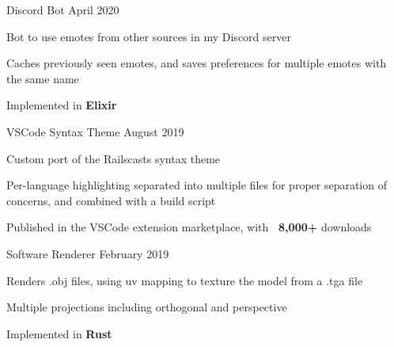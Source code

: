 

\begin{cventries}
    \cventry
    {Discord Bot} %
    {} %
    {}{April 2020}{
        \begin{cvitems} %
            \item {Bot to use emotes from other sources in my Discord server}
            \item {Caches previously seen emotes, and saves preferences for multiple emotes with the same name}
            \item {Implemented in \textbf{Elixir}}
        \end{cvitems}
    }

    \cventry
    {VSCode Syntax Theme} %
    {} %
    {}{August 2019}{
        \begin{cvitems} %
            \item {Custom port of the Railscasts syntax theme}
            \item {Per-language highlighting separated into multiple files for proper separation of concerns, and combined with a build script}
            \item {Published in the VSCode extension marketplace, with \textbf{~8,000+} downloads}
        \end{cvitems}
    }

    \cventry
    {Software Renderer} %
    {} %
    {}{February 2019}{
        \begin{cvitems} %
            \item {Renders .obj files, using uv mapping to texture the model from a .tga file}
            \item {Multiple projections including orthogonal and perspective}
            \item {Implemented in \textbf{Rust}}
        \end{cvitems}
    }



\end{cventries}
